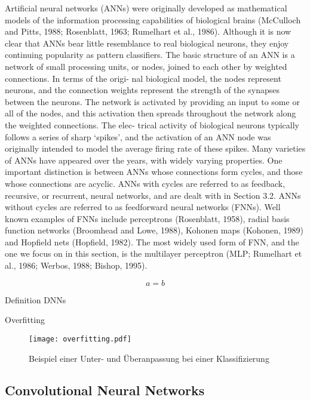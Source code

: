 Artificial neural networks (ANNs) were originally developed as mathematical models of the information processing capabilities of biological brains (McCulloch and Pitts, 1988; Rosenblatt, 1963; Rumelhart et al., 1986). Although it is now clear that ANNs bear little resemblance to real biological neurons, they enjoy continuing popularity as pattern classifiers.
The basic structure of an ANN is a network of small processing units, or nodes, joined to each other by weighted connections. In terms of the origi- nal biological model, the nodes represent neurons, and the connection weights represent the strength of the synapses between the neurons. The network is activated by providing an input to some or all of the nodes, and this activation then spreads throughout the network along the weighted connections. The elec- trical activity of biological neurons typically follows a series of sharp ‘spikes’, and the activation of an ANN node was originally intended to model the average firing rate of these spikes.
Many varieties of ANNs have appeared over the years, with widely varying properties. One important distinction is between ANNs whose connections form cycles, and those whose connections are acyclic. ANNs with cycles are referred to as feedback, recursive, or recurrent, neural networks, and are dealt with in Section 3.2. ANNs without cycles are referred to as feedforward neural networks (FNNs). Well known examples of FNNs include perceptrons (Rosenblatt, 1958), radial basis function networks (Broomhead and Lowe, 1988), Kohonen maps (Kohonen, 1989) and Hopfield nets (Hopfield, 1982). The most widely used form of FNN, and the one we focus on in this section, is the multilayer perceptron (MLP; Rumelhart et al., 1986; Werbos, 1988; Bishop, 1995).


\begin{equation}
a=b
\end{equation}

Definition DNNs


Overfitting

\begin{figure}[h]
\centering
\texttt{[image: overfitting.pdf]}
\caption{Beispiel einer Unter- und Überanpassung bei einer Klassifizierung}
\label{fig_overfitting}
\end{figure}


\subsection{Convolutional Neural Networks}
\label{grundlagen_nn_cnn}

